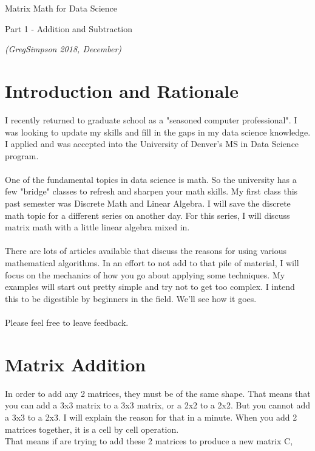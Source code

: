 \documentclass{article}
\begin{document}
\centerline{\sc \large Matrix Math for Data Science }
\vspace{.5pc}
\centerline{\sc Part 1 - Addition and Subtraction}
\centerline{\it (GregSimpson 2018, December)}
\vspace{2pc}


\section{Introduction and Rationale}
I recently returned to graduate school as a "seasoned computer professional".  I was looking to update my skills and fill in the gaps in my data science knowledge. 
I applied and was accepted into the University of Denver's MS in Data Science program.
\\
\\
One of the fundamental topics in data science is math. So the university has a few "bridge" classes to refresh and sharpen your math skills.
My first class this past semester was Discrete Math and Linear Algebra.  I will save the discrete math topic for a different series on another day.
For this series, I will discuss matrix math with a little linear algebra mixed in.
\\
\\
There are lots of articles available that discuss the reasons for using various mathematical algorithms.  In an effort to not add to that pile of material, I will focus on the mechanics of how you go about applying some techniques.  My examples will start out pretty simple and try not to get too complex.   I intend this to be digestible by beginners in the field.
We'll see how it goes.
\\
\\
 Please feel free to leave feedback.
\\
\vspace{3pc}





\newpage
\section{Matrix Addition}
In order to add any 2 matrices, they must be of the same shape.  That means that you can add a 3x3 matrix to a 3x3 matrix, or a 2x2 to a 2x2.
But you cannot add a 3x3 to a 2x3.  I will explain the reason for that in a minute.
When you add 2 matrices together, it is a cell by cell operation. 
\\That means if are trying to add these 2 matrices to produce a new matrix C, 
\end{document}
